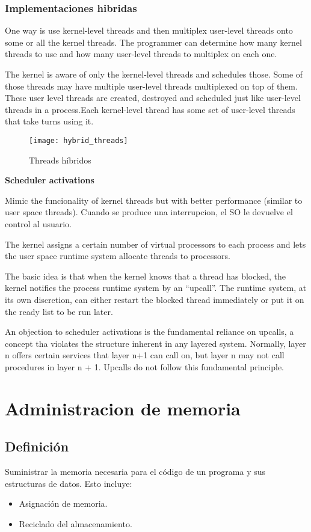 \documentclass[a4paper, twoside]{article}
\begin{document}
\subsubsection{Implementaciones hibridas}
One way is use kernel-level threads and then multiplex user-level threads onto some or all the kernel threads. The programmer can determine how many kernel threads to use and how many user-level threads to multiplex on each one.

The kernel is aware of only the kernel-level threads and schedules those. Some of those threads may have multiple user-level threads multiplexed on top of them. These user level threads are created, destroyed and scheduled just like user-level threads in a process.Each kernel-level thread has some set of user-level threads that take turns using it.

\begin{figure}[H]
	\centering
	\texttt{[image: hybrid\_threads]}
	\caption{Threads híbridos}
	\label{fig:hybrid_threads}
\end{figure}

\textbf{Scheduler activations}

Mimic the funcionality of kernel threads but with better performance (similar to user space threads).
Cuando se produce una interrupcion, el SO le devuelve el control al usuario.

The kernel assigns a certain number of virtual processors to each process and lets the user space runtime system allocate threads to processors.

The basic idea is that when the kernel knows that a thread has blocked, the kernel notifies the process runtime system by an “upcall”. The runtime system, at its own discretion, can either restart the blocked thread immediately or put it on the ready list to be run later.

An objection to scheduler activations is the fundamental reliance on upcalls, a concept tha violates the structure inherent in any layered system. Normally, layer n offers certain services that layer n+1 can call on, but layer n may not call procedures in layer n + 1. Upcalls do not follow this fundamental principle.

\newpage
\section{Administracion de memoria}
\subsection{Definición}
Suministrar la memoria necesaria para el código de un programa y sus estructuras de datos. Esto incluye:
\begin{itemize}
	\item Asignación de memoria.
	\item Reciclado del almacenamiento.
\end{itemize}
\end{document}
